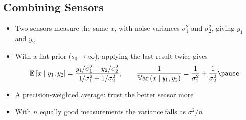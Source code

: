\begin{slide}
\section[-1]{Combining Sensors}

\begin{PauseHighLight}
  \begin{itemize}
  \item Two sensors measure the same $x$, with noise variances
    $\sigma_1^2$ and $\sigma_2^2$, giving $y_1$ and $y_2$\pause
  \item With a flat prior ($s_0\to\infty$), applying the last result
    twice gives
    \begin{align*}
      \av{x\mid y_1,y_2} = \frac{y_1/\sigma_1^2 + y_2/\sigma_2^2}
      {1/\sigma_1^2 + 1/\sigma_2^2}, \qquad
      \frac{1}{\Var{x\mid y_1,y_2}} = \frac{1}{\sigma_1^2} +
      \frac{1}{\sigma_2^2}\pause
    \end{align*}
  \item A precision-weighted average: trust the better sensor
    more\pause
  \item With $n$ equally good measurements the variance falls as
    $\sigma^2/n$\pause
  \end{itemize}
\end{PauseHighLight}

\end{slide}


